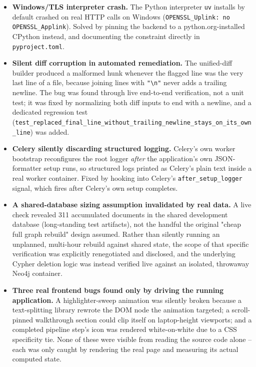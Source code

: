 \documentclass[12pt,a4paper]{report}
\begin{document}
\begin{itemize}
  \item \textbf{Windows/TLS interpreter crash.} The Python interpreter
        \texttt{uv} installs by default crashed on real \ac{HTTP} calls on
        Windows (\texttt{OPENSSL\_Uplink: no OPENSSL\_Applink}). Solved by
        pinning the backend to a python.org-installed CPython instead, and
        documenting the constraint directly in \texttt{pyproject.toml}.
  \item \textbf{Silent diff corruption in automated remediation.} The
        unified-diff builder produced a malformed hunk whenever the flagged
        line was the very last line of a file, because joining lines with
        \texttt{"\textbackslash n"} never adds a trailing newline. The bug
        was found through live end-to-end verification, not a unit test;
        it was fixed by normalizing both diff inputs to end with a newline,
        and a dedicated regression test
        (\texttt{test\_replaced\_final\_line\_without\_trailing\_newline\allowbreak\_stays\_on\_its\_own\_line})
        was added.
  \item \textbf{Celery silently discarding structured logging.} Celery's
        own worker bootstrap reconfigures the root logger \emph{after} the
        application's own \ac{JSON}-formatter setup runs, so structured logs
        printed as Celery's plain text inside a real worker container.
        Fixed by hooking into Celery's \texttt{after\_setup\_logger} signal,
        which fires after Celery's own setup completes.
  \item \textbf{A shared-database sizing assumption invalidated by real
        data.} A live check revealed 311 accumulated documents in the
        shared development database (long-standing test artifacts), not
        the handful the original "cheap full graph rebuild" design
        assumed. Rather than silently running an unplanned, multi-hour
        rebuild against shared state, the scope of that specific
        verification was explicitly renegotiated and disclosed, and the
        underlying Cypher deletion logic was instead verified live against
        an isolated, throwaway Neo4j container.
  \item \textbf{Three real frontend bugs found only by driving the running
        application.} A highlighter-sweep animation was silently broken
        because a text-splitting library rewrote the \ac{DOM} node the
        animation targeted; a scroll-pinned walkthrough section could clip
        itself on laptop-height viewports; and a completed pipeline step's
        icon was rendered white-on-white due to a \ac{CSS} specificity tie.
        None of these were visible from reading the source code alone --
        each was only caught by rendering the real page and measuring its
        actual computed state.
\end{itemize}
\end{document}
